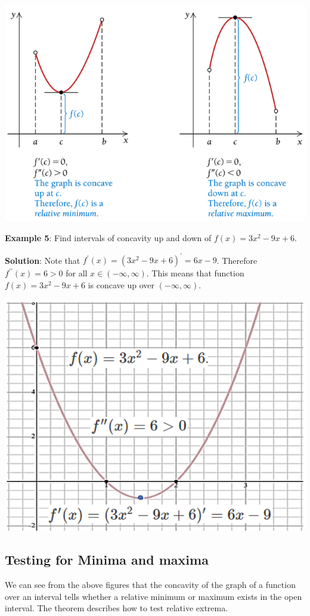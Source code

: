\documentclass[
]{book}
\begin{document}
\begin{center}\includegraphics[width=0.7\linewidth]{img08/w08-ConcavityVSderivatives} \end{center}

\textbf{Example 5}: Find intervals of concavity up and down of \(f(x)=3x^2-9x+6\).

\textbf{Solution}: Note that \(f^\prime(x) = (3x^2-9x+6)^\prime = 6x - 9\). Therefore \(f^{\prime\prime}(x) = 6 > 0\) for all \(x\in (-\infty, \infty)\). This means that function \(f(x) = 3x^2-9x+6\) is concave up over \((-\infty, \infty)\).

\begin{center}\includegraphics[width=0.45\linewidth]{img08/w08-Example5} \end{center}

\hfill\break

\hypertarget{testing-for-minima-and-maxima}{%
\subsection{Testing for Minima and maxima}\label{testing-for-minima-and-maxima}}

We can see from the above figures that the concavity of the graph of a function over an interval tells whether a relative minimum or maximum exists in the open interval. The theorem describes how to test relative extrema.
\end{document}
